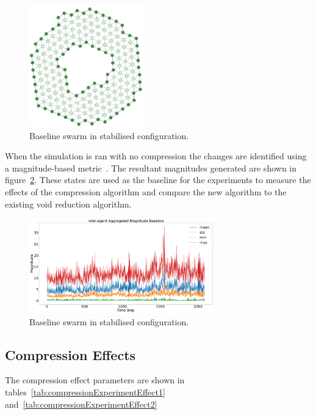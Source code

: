 \documentclass[12pt,a4paper]{IEEEtran}
\begin{document}
\begin{figure}[H]
	\begin{center}
		\includegraphics[width=5cm]{figures/exp1Start}
	\end{center}
	\caption{Baseline swarm in stabilised configuration. \label{fig:baselineSwarm}}
\end{figure}

When the simulation is ran with no compression the changes are identified using a magnitude-based metric~\cite{eliot2018metric}. The resultant magnitudes generated are shown in figure~\ref{fig:baselineSwarmMagnitude}. These states are used as the baseline for the experiments to measure the effects of the compression algorithm and compare the new algorithm to the existing void reduction algorithm.

\begin{figure}[ht]
	\begin{center}
		\includegraphics[width=8cm]{figures/interagentMagnitudeBaseline}
	\end{center}
	\caption{Baseline swarm in stabilised configuration. \label{fig:baselineSwarmMagnitude}}
\end{figure}

\subsection{Compression Effects\label{sec:CompressionEffect}}

The compression effect parameters are shown in tables~\ref{tab:compressionExperimentEffect1} and~\ref{tab:compressionExperimentEffect2}
\end{document}
